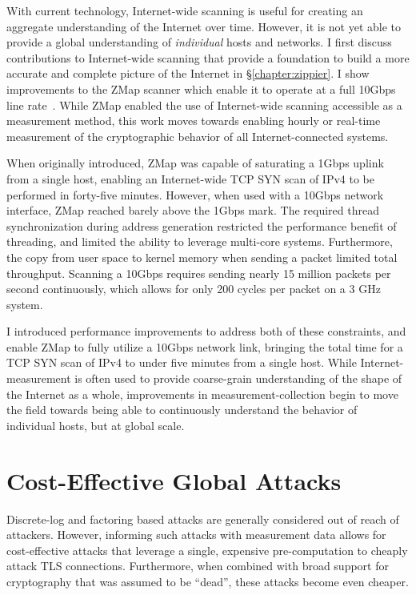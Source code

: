 With current technology, Internet-wide scanning is useful for creating an
aggregate understanding of the Internet over time. However, it is not yet
able to provide a global understanding of \textit{individual} hosts and
networks. I first discuss contributions to Internet-wide scanning that
provide a foundation to build a more accurate and complete picture of the
Internet in \S\ref{chapter:zippier}. I show improvements to the ZMap scanner
which enable it to operate at a full 10Gbps line
rate~\cite{zippier-zmap-2014}. While ZMap enabled the use of Internet-wide
scanning accessible as a measurement method, this work moves towards enabling
hourly or real-time measurement of the cryptographic behavior of all
Internet-connected systems.

When originally introduced, ZMap was capable of saturating a 1Gbps uplink from
a single host, enabling an Internet-wide TCP SYN scan of IPv4 to be performed
in forty-five minutes. However, when used with a 10Gbps network interface, ZMap
reached barely above the 1Gbps mark. The required thread synchronization during
address generation restricted the performance benefit of threading, and limited
the ability to leverage multi-core systems. Furthermore, the copy from user
space to kernel memory when sending a packet limited total throughput. Scanning
a 10Gbps requires sending nearly 15 million packets per second continuously,
which allows for only 200 cycles per packet on a 3 GHz system.

I introduced performance improvements to address both of these constraints, and
enable ZMap to fully utilize a 10Gbps network link, bringing the total time for
a TCP SYN scan of IPv4 to under five minutes from a single host. While
Internet-measurement is often used to provide coarse-grain understanding of the
shape of the Internet as a whole, improvements in measurement-collection begin
to move the field towards being able to continuously understand the behavior of
individual hosts, but at global scale.

\section{Cost-Effective Global Attacks}

Discrete-log and factoring based attacks are generally considered out of reach
of attackers.  However, informing such attacks with measurement data allows for
cost-effective attacks that leverage a single, expensive pre-computation to
cheaply attack TLS connections. Furthermore, when combined with broad support
for cryptography that was assumed to be “dead”, these attacks become even
cheaper.



